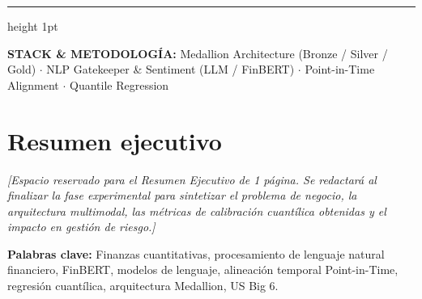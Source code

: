 \documentclass[11pt, a4paper]{report}
\begin{document}
\begin{titlepage}
    \vfill

    {\color{LightTint}\hrule height 1pt}
    \vspace{0.4cm}
    {\footnotesize\color{MutedGray}
    \textbf{STACK \& METODOLOGÍA:} Medallion Architecture (Bronze / Silver / Gold) $\cdot$ NLP Gatekeeper \& Sentiment (LLM / FinBERT) $\cdot$ Point-in-Time Alignment $\cdot$ Quantile Regression}
\end{titlepage}

\chapter*{Resumen ejecutivo}

\textit{[Espacio reservado para el Resumen Ejecutivo de 1 página. Se redactará al finalizar la fase experimental para sintetizar el problema de negocio, la arquitectura multimodal, las métricas de calibración cuantílica obtenidas y el impacto en gestión de riesgo.]}

\vspace{1em}
\noindent\textbf{\color{NavyPrimary}Palabras clave:} Finanzas cuantitativas, procesamiento de lenguaje natural financiero, FinBERT, modelos de lenguaje, alineación temporal Point-in-Time, regresión cuantílica, arquitectura Medallion, US Big 6.

\clearpage

\setcounter{tocdepth}{1}
\tableofcontents
\clearpage










\printbibliography[heading=bibintoc, title={Referencias bibliográficas}]

\appendix

\end{document}
